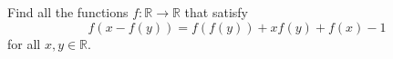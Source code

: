 Find all the functions $f : \mathbb{R} \to \mathbb{R}$ that satisfy
\[ f(x - f(y)) = f(f(y)) + x f(y) + f(x) - 1 \]
for all $x, y \in \mathbb{R}$.

